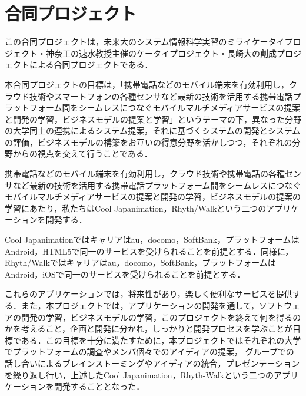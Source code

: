 \section{合同プロジェクト}
この合同プロジェクトは，未来大のシステム情報科学実習のミライケータイプロジェクト・神奈工の速水教授主催のケータイプロジェクト・長崎大の創成プロジェクトによる合同プロジェクトである．
\par
本合同プロジェクトの目標は，「携帯電話などのモバイル端末を有効利用し，クラウド技術やスマートフォンの各種センサなど最新の技術を活用する携帯電話プラットフォーム間をシームレスにつなぐモバイルマルチメディアサービスの提案と開発の学習，ビジネスモデルの提案と学習」というテーマの下，異なった分野の大学同士の連携によるシステム提案，それに基づくシステムの開発とシステムの評価，ビジネスモデルの構築をお互いの得意分野を活かしつつ，それぞれの分野からの視点を交えて行うことである．
\par
携帯電話などのモバイル端末を有効利用し，クラウド技術や携帯電話の各種センサなど最新の技術を活用する携帯電話プラットフォーム間をシームレスにつなぐモバイルマルチメディアサービスの提案と開発の学習，ビジネスモデルの提案の学習にあたり，私たちはCool Japanimation，Rhyth/Walkという二つのアプリケーションを開発する．
\par
Cool Japanimationではキャリアはau，docomo，SoftBank，プラットフォームはAndroid，HTML5で同一のサービスを受けられることを前提とする．同様に，
Rhyth/Walkではキャリアはau，docomo，SoftBank，プラットフォームはAndroid，iOSで同一のサービスを受けられることを前提とする．
\par
これらのアプリケーションでは，将来性があり，楽しく便利なサービスを提供する．また，本プロジェクトでは，アプリケーションの開発を通して，ソフトウェアの開発の学習，ビジネスモデルの学習，このプロジェクトを終えて何を得るのかを考えること，企画と開発に分かれ，しっかりと開発プロセスを学ぶことが目標である．この目標を十分に満たすために，本プロジェクトではそれぞれの大学でプラットフォームの調査やメンバ個々でのアイディアの提案， グループでの話し合いによるブレインストーミングやアイディアの統合，プレゼンテーションを繰り返し行い，上述したCool Japanimation，Rhyth-Walkという二つのアプリケーションを開発することとなった．
